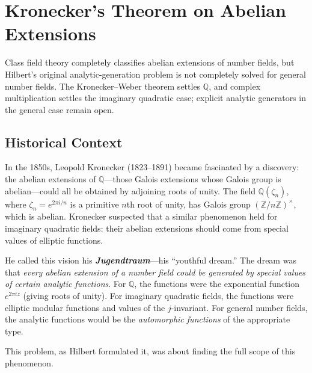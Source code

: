 
\chapter{Kronecker's Theorem on Abelian Extensions}

\begin{partiallybox}
Class field theory completely classifies abelian extensions of number fields, but Hilbert's original analytic-generation problem is not completely solved for general number fields. The Kronecker--Weber theorem settles $\mathbb{Q}$, and complex multiplication settles the imaginary quadratic case; explicit analytic generators in the general case remain open.
\end{partiallybox}

\section{Historical Context}

In the 1850s, Leopold Kronecker (1823--1891) became fascinated by a discovery: the abelian extensions of $\mathbb{Q}$---those Galois extensions whose Galois group is abelian---could all be obtained by adjoining roots of unity. The field $\mathbb{Q}(\zeta_n)$, where $\zeta_n = e^{2\pi i / n}$ is a primitive $n$th root of unity, has Galois group $(\mathbb{Z}/n\mathbb{Z})^\times$, which is abelian. Kronecker suspected that a similar phenomenon held for imaginary quadratic fields: their abelian extensions should come from special values of elliptic functions.

He called this vision his \textbf{\emph{Jugendtraum}}---his ``youthful dream.'' The dream was that \emph{every abelian extension of a number field could be generated by special values of certain analytic functions}. For $\mathbb{Q}$, the functions were the exponential function $e^{2\pi i z}$ (giving roots of unity). For imaginary quadratic fields, the functions were elliptic modular functions and values of the $j$-invariant. For general number fields, the analytic functions would be the \emph{automorphic functions} of the appropriate type.

This problem, as Hilbert formulated it, was about finding the full scope of this phenomenon.

